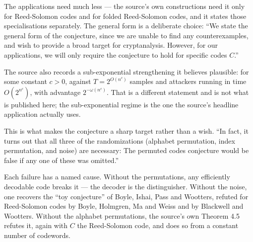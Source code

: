 \documentclass{aicr-conjecture}
\begin{document}
\begin{remark}\label{rem:general}
The applications need much less --- the source's own constructions need it
only for Reed-Solomon codes and for folded Reed-Solomon codes, and it
states those specialisations separately. The general form is a deliberate
choice: ``We state the general form of the conjecture, since we are unable
to find any counterexamples, and wish to provide a broad target for
cryptanalysis. However, for our applications, we will only require the
conjecture to hold for specific codes $C$.''

The source also records a sub-exponential strengthening it believes
plausible: for some constant $c > 0$, against $T = 2^{O(n^{c})}$ samples
and attackers running in time $O(2^{n^{c}})$, with advantage
$2^{-\omega(n^{c})}$. That is a different statement and is not what is
published here; the sub-exponential regime is the one the source's
headline application actually uses.
\end{remark}

\begin{remark}\label{rem:necessary}
This is what makes the conjecture a sharp target rather than a wish.
``In fact, it turns out that all three of the randomizations (alphabet
permutation, index permutation, and noise) are necessary: The permuted
codes conjecture would be false if any one of these was omitted.''

Each failure has a named cause. Without the permutations, any efficiently
decodable code breaks it --- the decoder is the distinguisher. Without
the noise, one recovers the ``toy conjecture'' of Boyle, Ishai, Pass and
Wootters, refuted for Reed-Solomon codes by Boyle, Holmgren, Ma and Weiss
and by Blackwell and Wootters. Without the alphabet permutations, the
source's own Theorem 4.5 refutes it, again with $C$ the Reed-Solomon code,
and does so from a constant number of codewords.
\end{remark}
\end{document}
